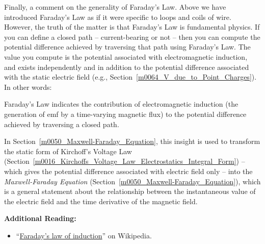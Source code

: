Finally, a comment on the generality of Faraday's Law.
Above we have introduced Faraday's Law as if it were specific to loops and coils of wire.
However, the truth of the matter is that Faraday's Law is fundamental physics.  If you can define a closed path -- current-bearing or not -- then you can compute the potential difference achieved by traversing that path using Faraday's Law.  The value you compute is the potential associated with electromagnetic induction, and exists independently and in addition to the potential difference associated with the static electric field (e.g., Section~\ref{m0064_V_due_to_Point_Charges}).   
In other words:
%
\begin{mdframed}[backgroundcolor=yellow!20,nobreak=true] 
Faraday's Law indicates the contribution of electromagnetic induction 
(the generation of emf by a time-varying magnetic flux) to the potential difference achieved by traversing a closed path.
\end{mdframed}

In Section~\ref{m0050_Maxwell-Faraday_Equation}, this insight is used to transform the static form of Kirchoff's Voltage Law 
(Section~\ref{m0016_Kirchoffs_Voltage_Law_Electrostatics_Integral_Form}) -- which gives the potential difference associated with electric field only -- into the \emph{Maxwell-Faraday Equation}
(Section~\ref{m0050_Maxwell-Faraday_Equation}), which is a general statement about the relationship between the instantaneous value of the electric field and the time derivative of the magnetic field.


{\bf Additional Reading:}
\begin{itemize}
\item ``\href{https://en.wikipedia.org/wiki/Faraday's_law_of_induction}{Faraday's law of induction}'' on Wikipedia.
\end{itemize}

